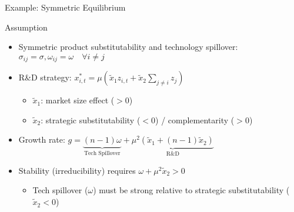 \documentclass[
  10pt,               %
  aspectratio=169,     %
]{beamer}
\theoremstyle{plain}
\begin{document}
\begin{frame}{Example: Symmetric Equilibrium}
  \begin{block}{Assumption}
    \label{symmetric}
    \begin{itemize}
      \item Symmetric product substitutability and technology spillover: $\sigma_{ij} = \sigma, \omega_{ij} = \omega \quad \forall i \neq j$
    \end{itemize}
  \end{block}
  \begin{itemize}
    \item R\&D strategy:
          $
            x_{i,t}^* = \mu \left( \tilde{x}_1 z_{i,t} + \tilde{x}_2 \sum_{j \neq i} z_j \right)
          $
          \begin{itemize}
            \item $\tilde{x}_1$: market size effect ($>0$)
            \item $\tilde{x}_2$: strategic substitutability ($<0$) / complementarity ($>0$)
          \end{itemize} \medskip{}
    \item Growth rate:
          $g =  \underbrace{(n-1)\omega}_{\text{Tech Spillover}} + \underbrace{\mu^2\left(\tilde{x}_1 + (n-1)\tilde{x}_2\right)}_{\text{R\&D}}$ \medskip{}
    \item Stability (irreducibility) requires
          $\omega + \mu^2 \tilde{x}_2 > 0$
          \begin{itemize}
            \item Tech spillover ($\omega$) must be strong relative to strategic substitutability ($\tilde{x}_2<0$)
          \end{itemize}
  \end{itemize}
  \hyperlink{bgp}{}
\end{frame}
\end{document}
